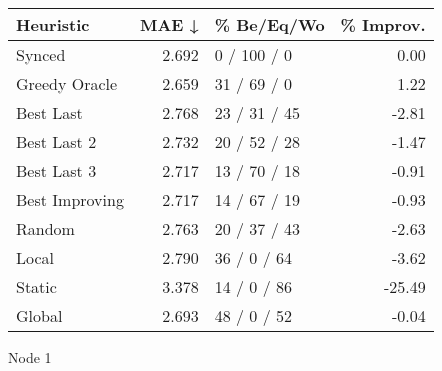 \begin{tabular}{lrlr}
\toprule
\textbf{Heuristic} & \textbf{MAE ↓} & \textbf{\% Be/Eq/Wo} & \textbf{\% Improv.} \\
\midrule
            Synced &          2.692 &          0 / 100 / 0 &                0.00 \\
     Greedy Oracle &          2.659 &          31 / 69 / 0 &                1.22 \\
         Best Last &          2.768 &         23 / 31 / 45 &               -2.81 \\
       Best Last 2 &          2.732 &         20 / 52 / 28 &               -1.47 \\
       Best Last 3 &          2.717 &         13 / 70 / 18 &               -0.91 \\
    Best Improving &          2.717 &         14 / 67 / 19 &               -0.93 \\
            Random &          2.763 &         20 / 37 / 43 &               -2.63 \\
             Local &          2.790 &          36 / 0 / 64 &               -3.62 \\
            Static &          3.378 &          14 / 0 / 86 &              -25.49 \\
            Global &          2.693 &          48 / 0 / 52 &               -0.04 \\
\bottomrule
\end{tabular}
\caption{Node 1}
\label{tab:hr_iid_lr05_le1_bs4_1}
